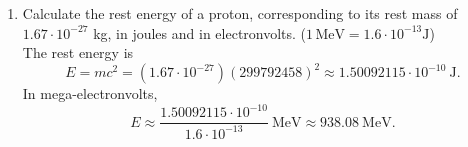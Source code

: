 \documentclass[a4paper,12pt]{letter}
\begin{document}
\begin{enumerate}
From the relation between kinetic energy and gamma factor,
$$ E_{kin} = (\gamma - 1)m_0 c^2, $$ 
we obtain
$$ \gamma = 1 + \frac{E_{kin}}{m_0 c^2} \approx 1 + \frac{1.0\cdot 10^{6}\ \text{eV}\cdot 1.6\cdot 10^{-19}\ \text{J/eV}}{(9.11\cdot 10^{-31}\,\text{kg})(299792458\,\text{m/s})^2}
\approx 2.9541604. $$
The relativistic mass is
$$ m = \gamma m_0 \approx 2.9541604 \cdot 9.11\cdot 10^{-31}\ \text{kg} \approx 2.69124\cdot 10^{-30}\ \text{kg}. $$
The speed follows from
$$ v = c\sqrt{1 - \frac{1}{\gamma^2}} \approx 0.94096436\,c \approx 2.82094\cdot 10^{8}\ \text{m/s}. $$

\item Calculate the rest energy of a proton, corresponding to its rest mass of $1.67 \cdot 10^{-27}$ kg, in joules and in electronvolts. ($1\,\text{MeV} = 1.6 \cdot 10^{-13}\text{J}$)\\

The rest energy is
$$ E = m c^2 = (1.67\cdot 10^{-27})(299792458)^2 \approx 1.50092115\cdot 10^{-10}\ \text{J}. $$
In mega-electronvolts,
$$ E \approx \frac{1.50092115\cdot 10^{-10}}{1.6\cdot 10^{-13}}\ \text{MeV} \approx 938.08\ \text{MeV}. $$

\end{enumerate}

\bigskip

\end{document}

